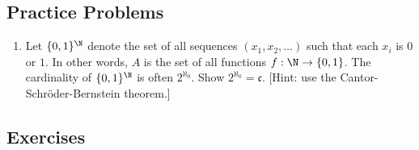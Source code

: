 \subsection*{Practice Problems}

\begin{enumerate}\renewcommand{\labelenumi}{\thesubsection.\theenumi}


\item Let $\{0,1\}^\N$ denote the set of all sequences $(x_1,x_2,\ldots)$ such that each $x_i$ is $0$ or $1$. In other words, $A$ is the set of all functions $f : \N \to \{0,1\}$. The cardinality of $\{0,1\}^\N$ is often $2^{\aleph_0}$. Show $2^{\aleph_0} = \mathfrak{c}$. [Hint: use the Cantor-Schr\"oder-Bernstein theorem.]
\end{enumerate}

\subsection*{Exercises}

